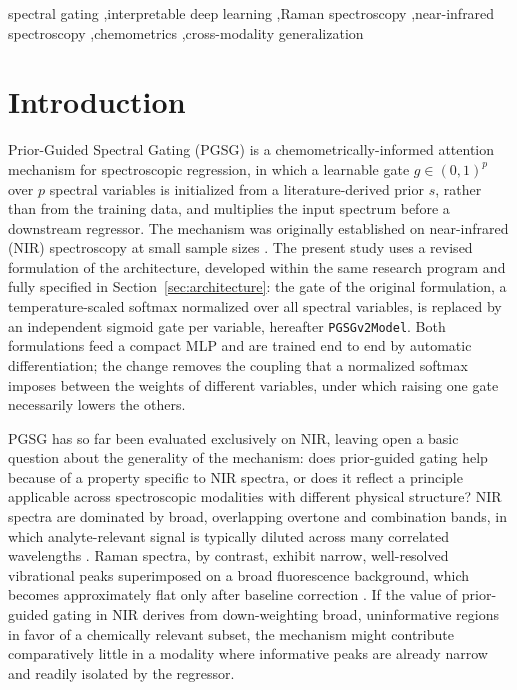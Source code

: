 \documentclass[preprint,12pt]{elsarticle}
\begin{document}
\begin{frontmatter}
\begin{keyword}
spectral gating \sep interpretable deep learning \sep Raman spectroscopy \sep near-infrared spectroscopy \sep chemometrics \sep cross-modality generalization
\end{keyword}

\end{frontmatter}

\linenumbers

\section{Introduction}
\label{sec:intro}

Prior-Guided Spectral Gating (PGSG) is a chemometrically-informed attention mechanism for spectroscopic regression, in which a learnable gate $g\in(0,1)^{p}$ over $p$ spectral variables is initialized from a literature-derived prior $s$, rather than from the training data, and multiplies the input spectrum before a downstream regressor. The mechanism was originally established on near-infrared (NIR) spectroscopy at small sample sizes \cite{coelho_pgsg0}. The present study uses a revised formulation of the architecture, developed within the same research program and fully specified in Section~\ref{sec:architecture}: the gate of the original formulation, a temperature-scaled softmax normalized over all spectral variables, is replaced by an independent sigmoid gate per variable, hereafter \texttt{PGSGv2Model}. Both formulations feed a compact MLP and are trained end to end by automatic differentiation; the change removes the coupling that a normalized softmax imposes between the weights of different variables, under which raising one gate necessarily lowers the others.

PGSG has so far been evaluated exclusively on NIR, leaving open a basic question about the generality of the mechanism: does prior-guided gating help because of a property specific to NIR spectra, or does it reflect a principle applicable across spectroscopic modalities with different physical structure? NIR spectra are dominated by broad, overlapping overtone and combination bands, in which analyte-relevant signal is typically diluted across many correlated wavelengths \cite{workman2012nir}. Raman spectra, by contrast, exhibit narrow, well-resolved vibrational peaks superimposed on a broad fluorescence background, which becomes approximately flat only after baseline correction \cite{smith2019raman}. If the value of prior-guided gating in NIR derives from down-weighting broad, uninformative regions in favor of a chemically relevant subset, the mechanism might contribute comparatively little in a modality where informative peaks are already narrow and readily isolated by the regressor.
\end{document}
